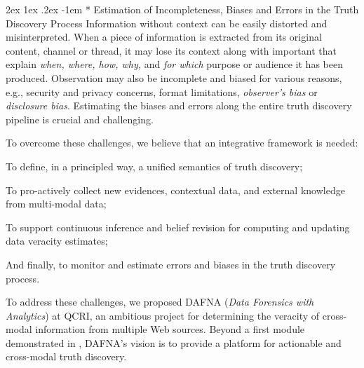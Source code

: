 \documentclass[prodmode,acmtecs]{acmsmall} %
\makeatletter
\renewcommand\paragraph{\@startsection{paragraph}{5}{\z@}%
                                       {2ex \@plus1ex \@minus .2ex}%
                                       {-1em}%
                                      {\sffamily\normalsize\bfseries}}
\makeatother
\begin{document}
\paragraph*{ Estimation of Incompleteness, Biases and Errors in the Truth Discovery Process}  
Information without context can be easily distorted and misinterpreted.
When a piece of information is extracted from its original 
content, channel or thread, it may lose its context along with important 
 that explain \emph{when, where, how, why,} and
\emph{for which} purpose or audience it has been produced. Observation may also be incomplete and biased for various 
reasons, e.g., security and privacy concerns, format limitations, \emph{observer's bias} or \emph{disclosure bias}. 
Estimating the biases and errors along the entire truth discovery pipeline is crucial and challenging.
%

To overcome these challenges, we believe that an integrative framework is needed:
\begin{inparaenum}[(i)]
\item To define, in a principled way, a unified semantics of truth discovery;
\item To pro-actively collect new evidences, contextual data, and external knowledge from multi-modal data; 
\item To support continuous inference and belief revision for computing and updating data veracity estimates;
\item And finally, to monitor and estimate errors and biases in the truth discovery process.
\end{inparaenum}


To address these challenges, we proposed DAFNA (\emph{Data Forensics with Analytics}) at QCRI, an ambitious project for determining the veracity of  cross-modal information from multiple Web sources. Beyond a first module demonstrated in \cite{Wagui15}, DAFNA's vision is to provide a platform for actionable and cross-modal truth discovery.
 
 
 



\end{document}
